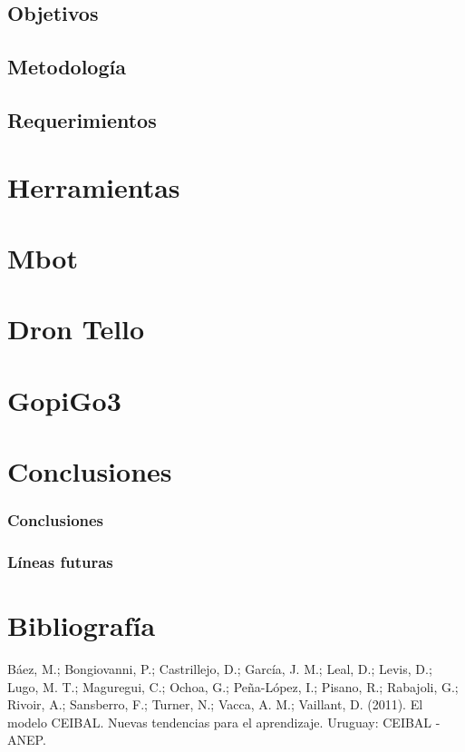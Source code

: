 \documentclass{report}
\begin{document}
\section{Objetivos}
\section{Metodología}
\section{Requerimientos}

\chapter{Herramientas}

\chapter{Mbot}

\chapter{Dron Tello}

\chapter{GopiGo3}

\chapter{Conclusiones}
\subsection{Conclusiones}
\subsection{Líneas futuras}

\chapter{Bibliografía}

Báez, M.; Bongiovanni, P.; Castrillejo, D.; García, J. M.; Leal, D.; Levis, D.; Lugo, M. T.; Maguregui, C.; Ochoa, G.;  Peña-López, I.; Pisano, R.; Rabajoli, G.; Rivoir, A.; Sansberro, F.; Turner, N.; Vacca, A. M.; Vaillant, D. (2011). El modelo CEIBAL. Nuevas tendencias para el aprendizaje. Uruguay: CEIBAL - ANEP.
\\
\end{document}
